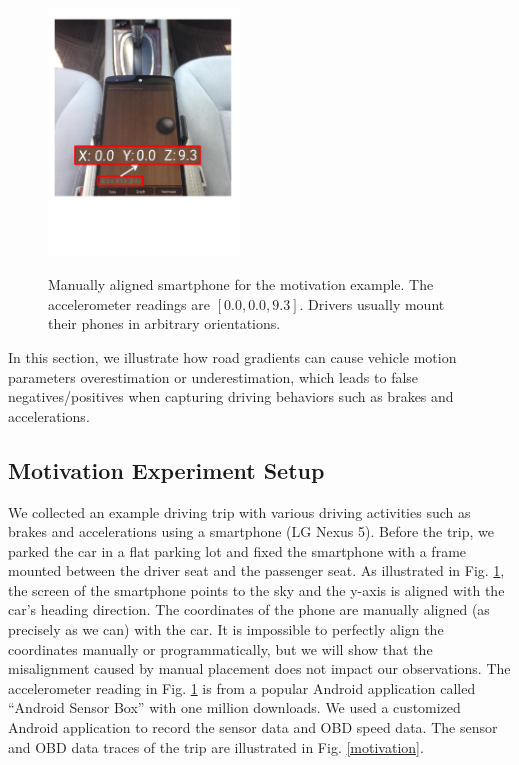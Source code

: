 

\begin{figure}[!tbp]
\begin{center}
\includegraphics[width=2.0in, angle=0]{Figs/SlopeAware/placement.pdf}
\vspace{-1.5cm}
\caption{Manually aligned smartphone for the motivation example. 
The accelerometer readings are $[0.0, 0.0, 9.3]$.
Drivers usually mount their phones in arbitrary orientations.}
\vspace{-0.8cm}
\label{placement}
\end{center}
\end{figure}


In this section, we illustrate how road gradients can cause 
vehicle motion parameters overestimation or underestimation, 
which leads to false negatives/positives
when capturing driving behaviors such as brakes and accelerations.


\subsection{Motivation Experiment Setup}

We collected an example driving trip with various driving activities 
such as brakes and accelerations using a smartphone (LG Nexus 5).
Before the trip, we parked the car in a flat parking lot and fixed
the smartphone with a frame mounted between the driver seat
and the passenger seat.
As illustrated in Fig. \ref{placement}, the screen of the smartphone points to 
the sky and the y-axis is aligned with 
the car's heading direction.
The coordinates of the phone are manually aligned (as precisely as we can) with the car. 
It is impossible to perfectly align the coordinates 
manually or programmatically,
but we will show that the misalignment caused by manual placement
does not impact our observations.
The accelerometer reading in Fig. \ref{placement} is from a popular 
Android application called ``Android Sensor Box'' with one million downloads.
We used a customized Android application to record the sensor data and OBD speed data.
The sensor and OBD data traces of the trip are illustrated in Fig. \ref{motivation}.


